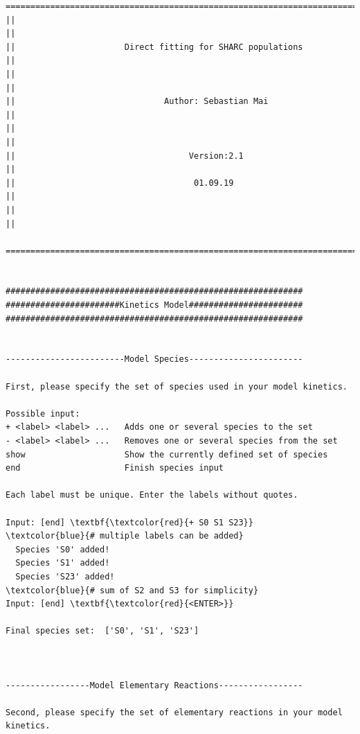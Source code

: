 \documentclass[a4paper,11pt,DIV=15,openany]{scrbook}
\begin{document}
\begin{oframed}
\footnotesize\begin{Verbatim}[commandchars=\\\{\}]
  ================================================================================
||                                                                                ||
||                      Direct fitting for SHARC populations                      ||
||                                                                                ||
||                              Author: Sebastian Mai                             ||
||                                                                                ||
||                                   Version:2.1                                  ||
||                                    01.09.19                                    ||
||                                                                                ||
  ================================================================================


############################################################
#######################Kinetics Model#######################
############################################################


------------------------Model Species-----------------------

First, please specify the set of species used in your model kinetics.

Possible input:
+ <label> <label> ...   Adds one or several species to the set
- <label> <label> ...   Removes one or several species from the set
show                    Show the currently defined set of species
end                     Finish species input

Each label must be unique. Enter the labels without quotes.

Input: [end] \textbf{\textcolor{red}{+ S0 S1 S23}}     \textcolor{blue}{# multiple labels can be added}
  Species 'S0' added!
  Species 'S1' added!
  Species 'S23' added!                                 \textcolor{blue}{# sum of S2 and S3 for simplicity}
Input: [end] \textbf{\textcolor{red}{<ENTER>}}

Final species set:  ['S0', 'S1', 'S23']



-----------------Model Elementary Reactions-----------------

Second, please specify the set of elementary reactions in your model kinetics.


\end{Verbatim}
\end{oframed}
\end{document}
